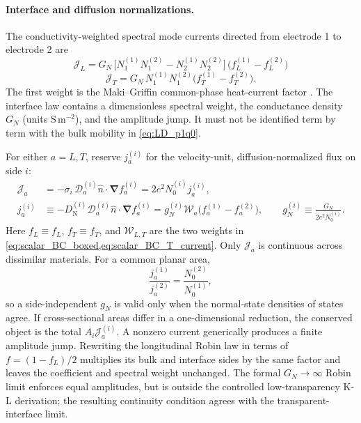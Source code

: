 \documentclass[
  aps,
  prb,
  preprint,
  superscriptaddress,
  longbibliography,
  nofootinbib
]{revtex4-2}
\newcommand{\bnabla}{\boldsymbol{\nabla}}
\newcommand{\DOS}{N_1}
\newcommand{\DN}{D_{\mathrm{N}}}
\newcommand{\fL}{f_L}
\newcommand{\fT}{f_T}
\begin{document}
\paragraph{Interface and diffusion normalizations.}
The conductivity-weighted spectral mode currents directed from electrode
1 to electrode 2 are
\begin{equation}
  \boxed{\;
    \mathcal J_L
    =
    G_N\,\big[\DOS^{(1)}\DOS^{(2)}-N_2^{(1)}N_2^{(2)}\big]\,
    \big(\fL^{(1)}-\fL^{(2)}\big)
  \;}
  \label{eq:scalar_BC_boxed}
\end{equation}
\begin{equation}
  \mathcal J_T
  =
  G_N\,\DOS^{(1)}\DOS^{(2)}
  \big(\fT^{(1)}-\fT^{(2)}\big).
  \label{eq:scalar_BC_T_current}
\end{equation}
The first weight is the Maki--Griffin common-phase heat-current factor
\cite{maki1965}. The interface law contains a dimensionless spectral
weight, the conductance density \(G_N\) (units \(\mathrm{S\,m^{-2}}\)),
and the amplitude jump. It must not be identified term by term with the
bulk mobility in \cref{eq:LD_p1q0}.

For either \(a=L,T\), reserve \(j_a^{(i)}\) for the velocity-unit,
diffusion-normalized flux on side \(i\):
\begin{align}
  \mathcal J_a
  &=
  -\sigma_i\,\mathcal D_a^{(i)}
  \hat n\!\cdot\!\bnabla f_a^{(i)}
  =
  2e^2N_0^{(i)}j_a^{(i)},\\
  j_a^{(i)}
  &\equiv
  -\DN^{(i)}\mathcal D_a^{(i)}
  \hat n\!\cdot\!\bnabla f_a^{(i)}
  =
  g_N^{(i)}\mathcal W_a
  \big(f_a^{(1)}-f_a^{(2)}\big),
  \qquad
  g_N^{(i)}\equiv\frac{G_N}{2e^2N_0^{(i)}} .
  \label{eq:KL_side_normalizations}
\end{align}
Here \(f_L\equiv\fL\), \(f_T\equiv\fT\), and
\(\mathcal W_{L,T}\) are the two weights in
\cref{eq:scalar_BC_boxed,eq:scalar_BC_T_current}.
Only \(\mathcal J_a\) is continuous across dissimilar materials. For a
common planar area,
\[
  \frac{j_a^{(1)}}{j_a^{(2)}}
  =
  \frac{N_0^{(2)}}{N_0^{(1)}} ,
\]
so a side-independent \(g_N\) is valid only when the normal-state densities
of states agree. If cross-sectional areas differ in a one-dimensional
reduction, the conserved object is the total \(A_i\mathcal J_a^{(i)}\).
A nonzero current generically produces a finite amplitude jump. Rewriting
the longitudinal Robin law in terms of \(f=(1-\fL)/2\) multiplies its bulk
and interface sides by the same factor and leaves the coefficient and
spectral weight unchanged. The formal \(G_N\to\infty\) Robin limit enforces
equal amplitudes, but is outside the controlled low-transparency K-L
derivation; the resulting continuity condition agrees with the
transparent-interface limit.
\end{document}

